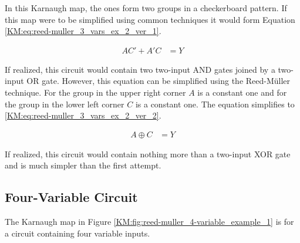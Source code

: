 \begin{figure}[H]
\end{figure}

In this Karnaugh map, the ones form two groups in a checkerboard pattern. If this map were to be simplified using common techniques it would form Equation \ref{KM:eq:reed-muller_3_vars_ex_2_ver_1}.

\begin{align}
  \label{KM:eq:reed-muller_3_vars_ex_2_ver_1}
  AC'+A'C &= Y 
\end{align}

If realized, this circuit would contain two two-input \textsf{AND} gates joined by a two-input \textsf{OR} gate. However, this equation can be simplified using the Reed-M\"{u}ller technique. For the group in the upper right corner $ A $ is a constant one and for the group in the lower left corner $ C $ is a constant one. The equation simplifies to \ref{KM:eq:reed-muller_3_vars_ex_2_ver_2}. 

\begin{align}
  \label{KM:eq:reed-muller_3_vars_ex_2_ver_2}
  A \oplus C &= Y 
\end{align}

If realized, this circuit would contain nothing more than a two-input \textsf{XOR} gate and is much simpler than the first attempt.

\subsection{Four-Variable Circuit}
\label{KM:subsec:four_variable_circuit}

The Karnaugh map in Figure \ref{KM:fig:reed-muller_4-variable_example_1} is for a circuit containing four variable inputs.

